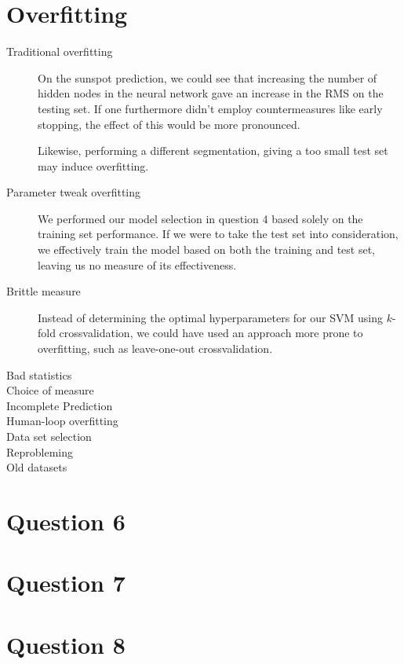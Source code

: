 \documentclass[11pt,a4paper]{article}
\begin{document}
\section{Overfitting}
\begin{description}
    \item[Traditional overfitting] {
        On the sunspot prediction, we could see that increasing the number of
        hidden nodes in the neural network gave an increase in the RMS on the
        testing set. If one furthermore didn't employ countermeasures like
        early stopping, the effect of this would be more pronounced.

        Likewise, performing a different segmentation, giving a too small test
        set may induce overfitting.
    }
    \item[Parameter tweak overfitting] {
        We performed our model selection in question 4 based solely on the
        training set performance. If we were to take the test set into
        consideration, we effectively train the model based on both the
        training and test set, leaving us no measure of its effectiveness.
    }
    \item[Brittle measure] {
        Instead of determining the optimal hyperparameters for our SVM using
        $k$-fold crossvalidation, we could have used an approach more prone
        to overfitting, such as leave-one-out crossvalidation.
    }
    \item[Bad statistics] {
        
    }
    \item[Choice of measure] {

    }
    \item[Incomplete Prediction] {

    }
    \item[Human-loop overfitting] {

    }
    \item[Data set selection] {

    }
    \item[Reprobleming] {

    }
    \item[Old datasets] {

    }
\end{description}

\section{Question 6}


\section{Question 7}


\section{Question 8}
\end{document}
